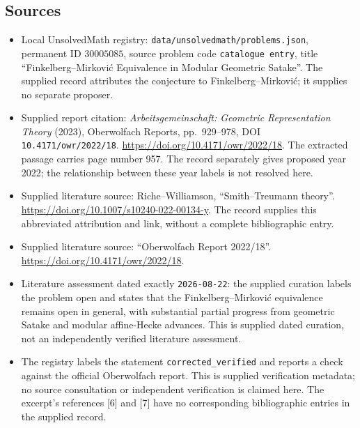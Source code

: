 \documentclass[11pt]{article}
\begin{document}
\subsection{Sources}
\begin{itemize}
\item Local UnsolvedMath registry: \texttt{data/unsolvedmath/problems.json}, permanent ID \(30005085\), source problem code \texttt{catalogue entry}, title ``Finkelberg--Mirkovi\'{c} Equivalence in Modular Geometric Satake''. The supplied record attributes the conjecture to Finkelberg--Mirkovi\'{c}; it supplies no separate proposer.
\item Supplied report citation: \emph{Arbeitsgemeinschaft: Geometric Representation Theory} (2023), Oberwolfach Reports, pp.~929--978, DOI \texttt{10.4171/owr/2022/18}. \url{https://doi.org/10.4171/owr/2022/18}. The extracted passage carries page number 957. The record separately gives proposed year 2022; the relationship between these year labels is not resolved here.
\item Supplied literature source: Riche--Williamson, ``Smith--Treumann theory''. \url{https://doi.org/10.1007/s10240-022-00134-y}. The record supplies this abbreviated attribution and link, without a complete bibliographic entry.
\item Supplied literature source: ``Oberwolfach Report 2022/18''. \url{https://doi.org/10.4171/owr/2022/18}.
\item Literature assessment dated exactly \texttt{2026-08-22}: the supplied curation labels the problem open and states that the Finkelberg--Mirkovi\'{c} equivalence remains open in general, with substantial partial progress from geometric Satake and modular affine-Hecke advances. This is supplied dated curation, not an independently verified literature assessment.
\item The registry labels the statement \texttt{corrected\_verified} and reports a check against the official Oberwolfach report. This is supplied verification metadata; no source consultation or independent verification is claimed here. The excerpt's references [6] and [7] have no corresponding bibliographic entries in the supplied record.
\end{itemize}
\end{document}
